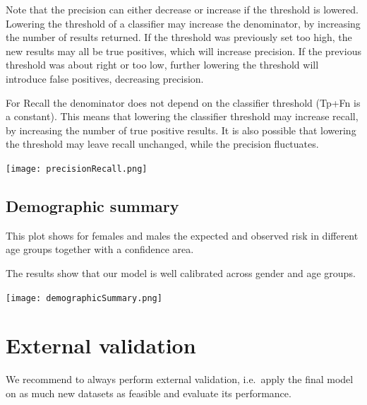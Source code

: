 \documentclass[]{article}
\begin{document}
Note that the precision can either decrease or increase if the threshold
is lowered. Lowering the threshold of a classifier may increase the
denominator, by increasing the number of results returned. If the
threshold was previously set too high, the new results may all be true
positives, which will increase precision. If the previous threshold was
about right or too low, further lowering the threshold will introduce
false positives, decreasing precision.

For Recall the denominator does not depend on the classifier threshold
(Tp+Fn is a constant). This means that lowering the classifier threshold
may increase recall, by increasing the number of true positive results.
It is also possible that lowering the threshold may leave recall
unchanged, while the precision fluctuates.

\texttt{[image: precisionRecall.png]}

\newpage

\subsection{Demographic summary}\label{demographic-summary}

This plot shows for females and males the expected and observed risk in
different age groups together with a confidence area.

The results show that our model is well calibrated across gender and age
groups.

\texttt{[image: demographicSummary.png]}

\newpage

\section{External validation}\label{external-validation}

We recommend to always perform external validation, i.e.~apply the final
model on as much new datasets as feasible and evaluate its performance.
\end{document}
